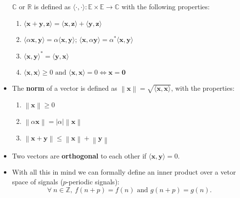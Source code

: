 \begin{itemize}
	      $\mathbb{C}$ or $\mathbb{R}$ is defined as
	      $\langle \cdot, \cdot \rangle : \mathbb{E} \times \mathbb{E} \longrightarrow \mathbb{C}$
	      with the following properties:
	      \begin{enumerate}
		      \item $\langle \bm{x} + \bm{y}, \bm{z} \rangle = \langle \bm{x}, \bm{z} \rangle + \langle \bm{y}, \bm{z} \rangle$
		      \item $\langle \alpha\bm{x}, \bm{y} \rangle = \alpha\langle \bm{x},\bm{y} \rangle$;
		            $\langle \bm{x}, \alpha\bm{y} \rangle = \alpha^*\langle \bm{x},\bm{y} \rangle$
		      \item $\langle \bm{x},\bm{y} \rangle^* = \langle \bm{y}, \bm{x} \rangle$
		      \item $\langle \bm{x},\bm{x} \rangle \ge 0 \text{ and } \langle \bm{x},\bm{x} \rangle = 0 \iff \bm{x} = \bm{0}$
	      \end{enumerate}
	\item The \textbf{norm} of a vector is defined as
	      $\left\lVert \bm{x} \right\lVert = \sqrt{\langle \bm{x},\bm{x} \rangle}$,
	      with the properties:
	      \begin{enumerate}
		      \item $\left\lVert \bm{x} \right\rVert \ge 0$
		      \item $\left\lVert \alpha\bm{x} \right\rVert = \left| \alpha \right| \left\lVert \bm{x} \right\rVert$
		      \item $\left\lVert \bm{x} + \bm{y} \right\rVert \le \left\lVert \bm{x} \right\rVert + \left\lVert \bm{y} \right\rVert$
	      \end{enumerate}
	\item Two vectors are \textbf{orthogonal} to each other if
	      $\langle \bm{x},\bm{y} \rangle = 0$.
	\item With all this in mind we can formally define an inner product over
	      a vetor space of signals ($p$-periodic signals):
	      \[
		      \forall\ n \in \mathbb{Z},\ f(n+p) = f(n) \text{ and } g(n+p) = g(n)
		      .\]
\end{itemize}
